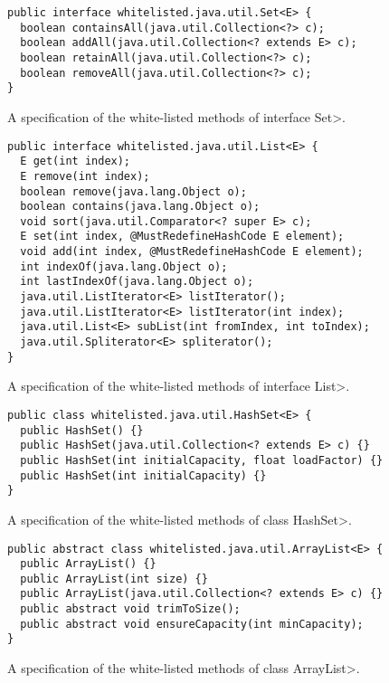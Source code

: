 \begin{figure}[t]
\begin{verbatim}
public interface whitelisted.java.util.Set<E> {
  boolean containsAll(java.util.Collection<?> c);
  boolean addAll(java.util.Collection<? extends E> c);
  boolean retainAll(java.util.Collection<?> c);
  boolean removeAll(java.util.Collection<?> c);
}
\end{verbatim}
\caption{A specification of the white-listed methods of interface \<Set>.}
\label{fig:white_listed_Set}
\end{figure}

\begin{figure}[t]
\begin{verbatim}
public interface whitelisted.java.util.List<E> {
  E get(int index);
  E remove(int index);
  boolean remove(java.lang.Object o);
  boolean contains(java.lang.Object o);
  void sort(java.util.Comparator<? super E> c);
  E set(int index, @MustRedefineHashCode E element);
  void add(int index, @MustRedefineHashCode E element);
  int indexOf(java.lang.Object o);
  int lastIndexOf(java.lang.Object o);
  java.util.ListIterator<E> listIterator();
  java.util.ListIterator<E> listIterator(int index);
  java.util.List<E> subList(int fromIndex, int toIndex);
  java.util.Spliterator<E> spliterator();
}
\end{verbatim}
\caption{A specification of the white-listed methods of interface \<List>.}
\label{fig:white_listed_List}
\end{figure}

\begin{figure}
\begin{verbatim}
public class whitelisted.java.util.HashSet<E> {
  public HashSet() {}
  public HashSet(java.util.Collection<? extends E> c) {}
  public HashSet(int initialCapacity, float loadFactor) {}
  public HashSet(int initialCapacity) {}
}
\end{verbatim}
\caption{A specification of the white-listed methods of class \<HashSet>.}
\label{fig:white_listed_HashSet}
\end{figure}

\begin{figure}
\begin{verbatim}
public abstract class whitelisted.java.util.ArrayList<E> {
  public ArrayList() {}
  public ArrayList(int size) {}
  public ArrayList(java.util.Collection<? extends E> c) {}
  public abstract void trimToSize();
  public abstract void ensureCapacity(int minCapacity);
}
\end{verbatim}
\caption{A specification of the white-listed methods of class \<ArrayList>.}
\label{fig:white_listed_ArrayList}
\end{figure}

